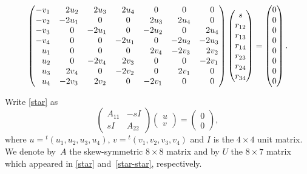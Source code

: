 \documentclass[pdftex]{sigma}
\numberwithin{equation}{section}
\theoremstyle{definition}
\newcommand{\0}{\boldsymbol{0}}
\begin{document}
\begin{gather}
\begin{pmatrix}
-v_1 & \hphantom{-}2u_2 & \hphantom{-}2u_3 & \hphantom{-}2u_4 & \hphantom{-}0 & \hphantom{-}0 & \hphantom{-}0
\\
-v_2 & -2u_1 & \hphantom{-}0 & \hphantom{-}0 & \hphantom{-}2u_3 & \hphantom{-}2u_4 & \hphantom{-}0
\\
-v_3 & \hphantom{-}0 & -2u_1 & \hphantom{-}0 & -2u_2 & \hphantom{-}0 & \hphantom{-}2u_4
\\
-v_4 & \hphantom{-}0 & \hphantom{-}0 & -2u_1 & \hphantom{-}0 & -2u_2 & -2u_3
\\
\hphantom{-}u_1 & \hphantom{-}0 & \hphantom{-}0 & \hphantom{-}0 & \hphantom{-}2v_4 & -2v_3 & \hphantom{-}2v_2
\\
\hphantom{-}u_2 & \hphantom{-}0 & -2v_4 & \hphantom{-}2v_3 & \hphantom{-}0 & \hphantom{-}0 & -2v_1
\\
\hphantom{-}u_3 & \hphantom{-}2v_4 & \hphantom{-}0 & -2v_2 & \hphantom{-}0 & \hphantom{-}2v_1 & \hphantom{-}0
\\
\hphantom{-}u_4 & -2v_3 & \hphantom{-}2v_2 & \hphantom{-}0 & -2v_1 & \hphantom{-}0 & \hphantom{-}0
\end{pmatrix}
\begin{pmatrix}
s
\\
r_{12}
\\
r_{13}
\\
r_{14}
\\
r_{23}
\\
r_{24}
\\
r_{34}
\end{pmatrix} =
\begin{pmatrix}
0
\\
0
\\
0
\\
0
\\
0
\\
0
\\
0
\\
0
\end{pmatrix}.\label{star-star}
\end{gather}

Write \eqref{star} as
\[
\begin{pmatrix}
A_{11} & -sI
\\
sI & A_{22}
\end{pmatrix}
\begin{pmatrix}
u
\\
v
\end{pmatrix} =
\begin{pmatrix}
0
\\
0
\end{pmatrix},
\]
where $u = {}^t(u_1, u_2, u_3, u_4)$, $v = {}^t(v_1, v_2, v_3, v_4)$ and $I$ is the $4\times 4$ unit matrix.
We denote by~$A$ the skew-symmetric $8\times 8$ matrix
and by $U$ the $8\times 7$ matrix which appeared in \eqref{star} and~\eqref{star-star}, respectively.
\end{document}
